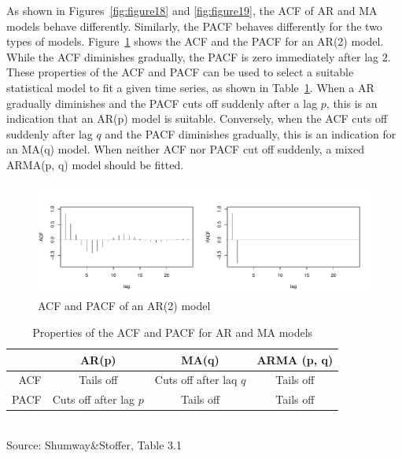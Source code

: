 As shown in Figures~\ref{fig:figure18} and \ref{fig:figure19}, the ACF of AR and MA models behave differently. Similarly, the PACF behaves differently for the two types of models. Figure~\ref{fig:figure20} shows the ACF and the PACF for an AR(2) model. While the ACF diminishes gradually, the PACF is zero immediately after lag $2$. These properties of the ACF and PACF can be used to select a suitable statistical model to fit a given time series, as shown in Table~\ref{tab:modelselection}. When a AR gradually diminishes and the PACF cuts off suddenly after a lag $p$, this is an indication that an AR(p) model is suitable. Conversely, when the ACF cuts off suddenly after lag $q$ and the PACF diminishes gradually, this is an indication for an MA(q) model. When neither ACF nor PACF cut off suddenly, a mixed ARMA(p, q) model should be fitted.


\begin{figure}
\centering
\includegraphics[width=.9\textwidth]{figure20.pdf}
\caption{ACF and PACF of an AR(2) model}
\label{fig:figure20}
\end{figure}


\begin{table}
\centering
\renewcommand{\arraystretch}{1.5}
\begin{tabular}{r|c|c|c} \hline
 & AR(p) & MA(q) & ARMA (p, q) \\ \hline
 ACF & Tails off & Cuts off after laq $q$ & Tails off \\
 PACF & Cuts off after lag $p$ & Tails off & Tails off \\ \hline
\end{tabular} \\

\vspace{\baselineskip}
\scriptsize Source: Shumway\&Stoffer, Table 3.1 \normalsize
\caption{Properties of the ACF and PACF for AR and MA models}
\label{tab:modelselection}
\end{table}

